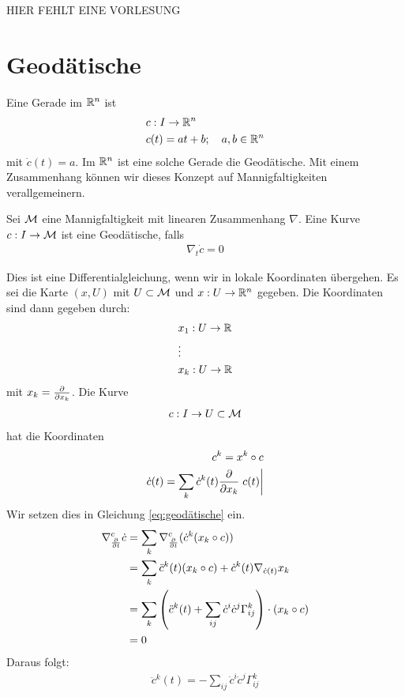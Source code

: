 
HIER FEHLT EINE VORLESUNG

\section{Geodätische}
Eine Gerade im $\mathbb{R}^n$ ist
\begin{align}
&c: I \to \mathbb{R}^n\\
&c(t) = a t + b; \quad a,b\in\mathbb{R}^n
\end{align}
mit $\dot{c}(t)=a$.
Im $\mathbb{R}^n$ ist eine solche Gerade die Geodätische.
Mit einem Zusammenhang können wir dieses Konzept auf Mannigfaltigkeiten verallgemeinern.
\begin{defs}[Geodätische]
Sei $\mathcal{M}$ eine Mannigfaltigkeit mit linearen Zusammenhang $\nabla$.
Eine Kurve $c : I \to \mathcal{M}$ ist eine Geodätische, falls
\begin{align}
\label{eq:geodätische}
\nabla_t \dot{c} = 0
\end{align}
\end{defs}
Dies ist eine Differentialgleichung, wenn wir in lokale Koordinaten übergehen.
Es sei die Karte $(x, U)$ mit $U \subset \mathcal{M}$ und $x: U \to \mathbb{R}^n$ gegeben.
Die Koordinaten sind dann gegeben durch:
\begin{align*}
&x_1 : U \to \mathbb{R}\\
&\vdots\\
&x_k : U \to \mathbb{R}
\end{align*}
mit $x_k = \pdv{x_k}$.
Die Kurve
\begin{align*}
c : I \to U \subset \mathcal{M}
\end{align*}
hat die Koordinaten
\begin{align*}
c^k = x^k \circ c\\
\dot{c}(t) = \sum_k \dot{c}^k(t) \pdv{x_k} \eval{c(t)}
\end{align*}
Wir setzen dies in Gleichung \ref{eq:geodätische} ein.
\begin{align*}
\nabla^c_{\pdv{t}} \dot{c} &= \sum_k \nabla^c_{\pdv{t}} (\dot{c}^k (x_k \circ c))\\
&= \sum_k \ddot{c}^k (t) (x_k \circ c) + \dot{c}^k (t) \nabla_{\dot{c}(t)} x_k\\
&= \sum_k \left( \ddot{c}^k (t) + \sum_{ij} \dot{c}^i \dot{c}^j \Gamma^k_{ij} \right) \cdot (x_k \circ c) \\
&= 0 
\end{align*}
Daraus folgt:
\begin{align}
\ddot{c}^k (t) = - \sum_{ij} \dot{c}^i \dot{c}^j \Gamma^k_{ij}
\end{align}

